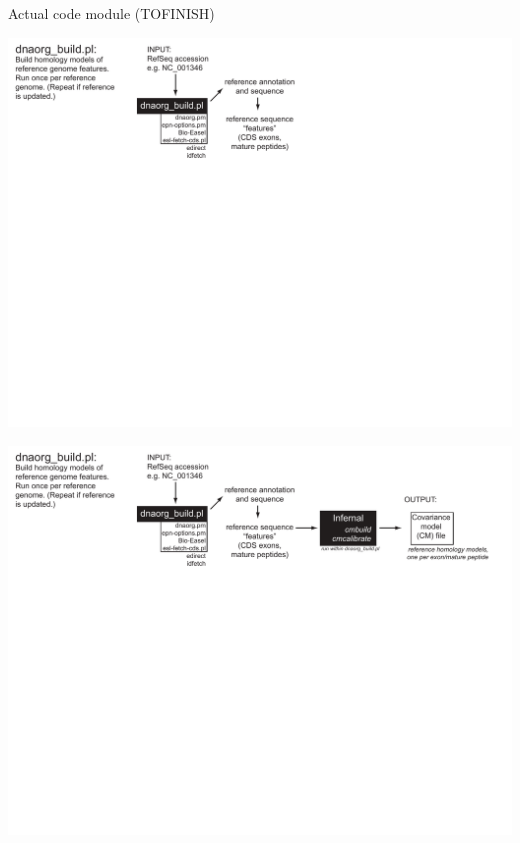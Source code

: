 \documentclass[landscape]{slides}
\begin{document}
\begin{slide}

Actual code module (TOFINISH)
\vfill
\end{slide}
\begin{slide}
\includegraphics[width=10in]{figs/dnaorg-scripts-build1}
\vfill
\end{slide}
\begin{slide}
\includegraphics[width=10in]{figs/dnaorg-scripts-build2}
\vfill
\end{slide}
\end{document}
